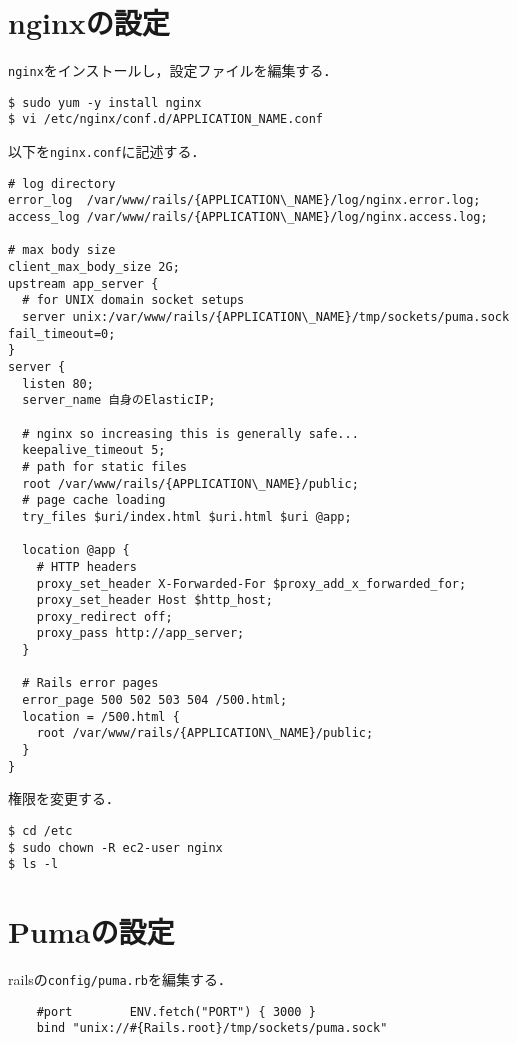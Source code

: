 \section{nginxの設定}
\texttt{nginx}をインストールし，設定ファイルを編集する．
\begin{screen}
    \texttt{\$ sudo yum -y install nginx}\\
    \texttt{\$ vi /etc/nginx/conf.d/APPLICATION\_NAME.conf}
\end{screen}
以下を\texttt{nginx.conf}に記述する．
\begin{screen}
    \begin{lstlisting}
# log directory
error_log  /var/www/rails/{APPLICATION\_NAME}/log/nginx.error.log; 
access_log /var/www/rails/{APPLICATION\_NAME}/log/nginx.access.log;

# max body size
client_max_body_size 2G;
upstream app_server {
  # for UNIX domain socket setups
  server unix:/var/www/rails/{APPLICATION\_NAME}/tmp/sockets/puma.sock fail_timeout=0; 
}
server {
  listen 80;
  server_name 自身のElasticIP;

  # nginx so increasing this is generally safe...
  keepalive_timeout 5;
  # path for static files
  root /var/www/rails/{APPLICATION\_NAME}/public;
  # page cache loading
  try_files $uri/index.html $uri.html $uri @app;

  location @app {
    # HTTP headers
    proxy_set_header X-Forwarded-For $proxy_add_x_forwarded_for;
    proxy_set_header Host $http_host;
    proxy_redirect off;
    proxy_pass http://app_server;
  }

  # Rails error pages
  error_page 500 502 503 504 /500.html;
  location = /500.html {
    root /var/www/rails/{APPLICATION\_NAME}/public; 
  }
}
\end{lstlisting}
\end{screen}
権限を変更する．
\begin{screen}
    \texttt{\$ cd /etc}\\
    \texttt{\$ sudo chown -R ec2-user nginx}\\
    \texttt{\$ ls -l}
\end{screen}

\section{Pumaの設定}
railsの\texttt{config/puma.rb}を編集する．
\begin{lstlisting}
    #port        ENV.fetch("PORT") { 3000 }
    bind "unix://#{Rails.root}/tmp/sockets/puma.sock"       
\end{lstlisting}

